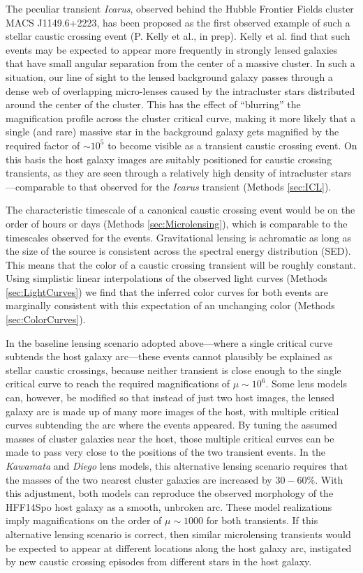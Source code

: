 The peculiar transient {\it Icarus}, observed behind the Hubble
Frontier Fields cluster MACS J1149.6+2223, has been proposed as the
first observed example of such a stellar caustic crossing event
(P. Kelly et al., in prep). Kelly et al. find that such events may be
expected to appear more frequently in strongly lensed galaxies that
have small angular separation from the center of a massive cluster. In
such a situation, our line of sight to the lensed background galaxy
passes through a dense web of overlapping micro-lenses caused by the
intracluster stars distributed around the center of the cluster. This
has the effect of ``blurring'' the magnification profile across the
cluster critical curve, making it more likely that a single (and rare)
massive star in the background galaxy gets magnified by the required
factor of $\sim10^5$ to become visible as a transient caustic crossing
event.  On this basis the \spock host galaxy images are suitably
positioned for caustic crossing transients, as they are seen through a
relatively high density of intracluster stars---comparable to that
observed for the {\it Icarus} transient (Methods \ref{sec:ICL}).

The characteristic timescale of a canonical caustic crossing event
would be on the order of hours or days (Methods
\ref{sec:Microlensing}), which is comparable to the timescales
observed for the \spock events. Gravitational lensing is achromatic as
long as the size of the source is consistent across the spectral
energy distribution (SED).  This means that the color of a caustic
crossing transient will be roughly constant.  Using simplistic linear
interpolations of the observed light curves (Methods
\ref{sec:LightCurves}) we find that the inferred color curves for both
\spock events are marginally consistent with this expectation of an
unchanging color (Methods \ref{sec:ColorCurves}).

In the baseline lensing scenario adopted above---where a single
critical curve subtends the \spock host galaxy arc---these events
cannot plausibly be explained as stellar caustic crossings, because
neither transient is close enough to the single critical curve to
reach the required magnifications of $\mu\sim10^6$.  Some lens models
can, however, be modified so that instead of just two host images, the
lensed galaxy arc is made up of many more images of the host, with
multiple critical curves subtending the arc where the \spock events
appeared.  By tuning the assumed masses of cluster galaxies near the
\spock host, those multiple critical curves can be made to pass very
close to the positions of the two \spock transient events.  In the
{\it Kawamata} and {\it Diego} lens models, this alternative lensing
scenario requires that the masses of the two nearest cluster galaxies
are increased by $30-60\%$.  With this adjustment, both models can
reproduce the observed morphology of the HFF14Spo host galaxy as a
smooth, unbroken arc.  These model realizations imply magnifications
on the order of $\mu\sim1000$ for both \spock transients. If this
alternative lensing scenario is correct, then similar microlensing
transients would be expected to appear at different locations along
the host galaxy arc, instigated by new caustic crossing episodes from
different stars in the host galaxy.
